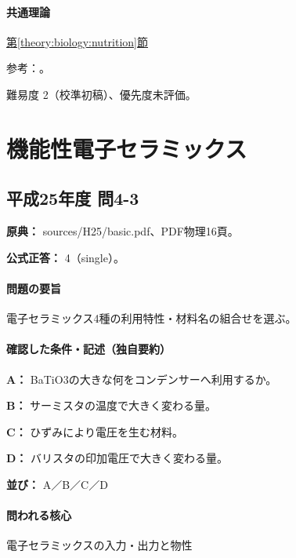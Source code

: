 \paragraph{共通理論} \hyperref[theory:biology:nutrition]{第\ref*{theory:biology:nutrition}節}

\par 参考：\cite{nih_amino}。

\par 難易度 2（校準初稿）、優先度未評価。

\section{機能性電子セラミックス}

\subsection{平成25年度 問4-3}
\label{q:h25-reg-basic-4-3}

\noindent\textbf{原典：} sources/H25/basic.pdf、PDF物理16頁。

\textbf{公式正答：} 4（single）。

\paragraph{問題の要旨} 電子セラミックス4種の利用特性・材料名の組合せを選ぶ。

\paragraph{確認した条件・記述（独自要約）}\mbox{}\par

\noindent\textbf{A：} BaTiO3の大きな何をコンデンサーへ利用するか。\par

\noindent\textbf{B：} サーミスタの温度で大きく変わる量。\par

\noindent\textbf{C：} ひずみにより電圧を生む材料。\par

\noindent\textbf{D：} バリスタの印加電圧で大きく変わる量。\par

\noindent\textbf{並び：} A／B／C／D\par

\paragraph{問われる核心} 電子セラミックスの入力・出力と物性

